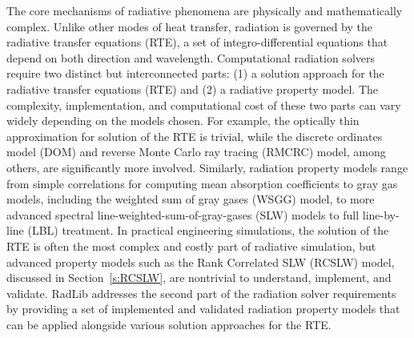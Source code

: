 \documentclass[preprint,12pt]{elsarticle}
\begin{document}
The core mechanisms of radiative phenomena are physically and mathematically complex.
Unlike other modes of heat transfer, radiation is governed by the radiative transfer equations (RTE), a set of integro-differential equations that depend on both direction and wavelength.
Computational radiation solvers require two distinct but interconnected parts: (1) a solution approach for the radiative transfer equations (RTE) and (2) a radiative property model. The complexity, implementation, and computational cost of these two parts can vary widely depending on the models chosen.
For example, the optically thin approximation for solution of the RTE is trivial, while the discrete ordinates model (DOM) and reverse Monte Carlo ray tracing (RMCRC) model, among others, are significantly more involved.
Similarly, radiation property models range from simple correlations for computing mean absorption coefficients to gray gas models, including the weighted sum of gray gases (WSGG) model, to more advanced spectral line-weighted-sum-of-gray-gases (SLW) models to full line-by-line (LBL) treatment.
In practical engineering simulations, the solution of the RTE is often the most complex and costly part of radiative simulation, but advanced property models such as the Rank Correlated SLW (RCSLW) model, discussed in Section~\ref{s:RCSLW}, are nontrivial to understand, implement, and validate.
RadLib addresses the second part of the radiation solver requirements by providing a set of implemented and validated radiation property models that can be applied alongside various solution approaches for the RTE.
\end{document}
